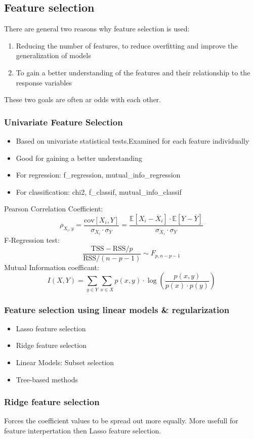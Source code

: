\subsection{Feature selection}
There are general two reasons why feature selection is used:
\begin{enumerate}
    \item Reducing the number of features, to reduce overfitting and improve the generalization of models
    \item To gain a better understanding of the features and their relationship to the response variables
\end{enumerate}
These two goals are often ar odds with each other.
\subsubsection{Univariate Feature Selection}
\begin{itemize}
    \item Based on univariate statistical tests.Examined for each feature individually
    \item Good for gaining a better understanding
    \item For regression: f\_regression, mutual\_info\_regression
    \item For classification: chi2, f\_classif, mutual\_info\_classif
\end{itemize}
Pearson Correlation Coefficient:
\[
\rho_{X_i,y} = \frac{\text{cov}[X_i,Y]}{\sigma_{X_i}\cdot \sigma_Y} = \frac{\mathbb{E}[X_i-\overline{X}_i]\cdot \mathbb{E}[Y-\overline{Y}]}{\sigma_{X_i}\cdot \sigma_Y}
\]
F-Regression test:
\[
\frac{\text{TSS}-\text{RSS}/p}{\text{RSS}/(n-p-1)} \sim F_{p,n-p-1}
\]
Mutual Information coefficant:
\[
I(X,Y) = \sum_{y \in Y} \sum_{x \in X} p(x,y)\cdot \log\left(\frac{p(x,y)}{p(x)\cdot p(y)}\right)
\]
\subsubsection{Feature selection using linear models \& regularization}
\begin{itemize}
    \item Lasso feature selection
    \item Ridge feature selection
    \item Linear Models: Subset selection
    \item Tree-based methods
\end{itemize}
\subsubsection*{Ridge feature selection}
Forces the coefficient values to be spread out more equally.
More usefull for feature interpertation then Lasso feature selection.

